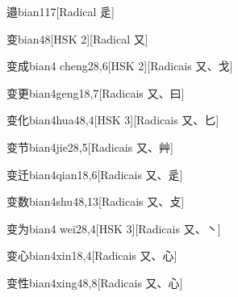 \begin{entry}{邉}{bian1}{17}[Radical ⾡]
\end{entry}

\begin{entry}{变}{bian4}{8}[HSK 2][Radical ⼜]
\end{entry}

\begin{entry}{变成}{bian4 cheng2}{8,6}[HSK 2][Radicais ⼜、⼽]
\end{entry}

\begin{entry}{变更}{bian4geng1}{8,7}[Radicais ⼜、⽈]
\end{entry}

\begin{entry}{变化}{bian4hua4}{8,4}[HSK 3][Radicais ⼜、⼔]
\end{entry}

\begin{entry}{变节}{bian4jie2}{8,5}[Radicais ⼜、⾋]
\end{entry}

\begin{entry}{变迁}{bian4qian1}{8,6}[Radicais ⼜、⾡]
\end{entry}

\begin{entry}{变数}{bian4shu4}{8,13}[Radicais ⼜、⽁]
\end{entry}

\begin{entry}{变为}{bian4 wei2}{8,4}[HSK 3][Radicais ⼜、⼂]
\end{entry}

\begin{entry}{变心}{bian4xin1}{8,4}[Radicais ⼜、⼼]
\end{entry}

\begin{entry}{变性}{bian4xing4}{8,8}[Radicais ⼜、⼼]
\end{entry}

